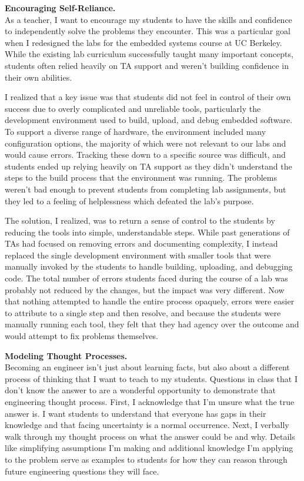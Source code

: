\documentclass[12pt]{article} %
\begin{document}
\textbf{\textsf{\large Encouraging Self-Reliance.}}\\
As a teacher, I want to encourage my students to have the skills and confidence
to independently solve the problems they encounter. This was a particular goal
when I redesigned the labs for the embedded systems course at UC Berkeley.
While the existing lab curriculum successfully taught many important concepts,
students often relied heavily on TA support and weren't building confidence in
their own abilities.

I realized that a key issue was that students did not feel in control of their
own success due to overly complicated and unreliable tools, particularly the
development environment used to build, upload, and debug embedded software. To
support a diverse range of hardware, the environment included many
configuration options, the majority of which were not relevant to our labs and
would cause errors. Tracking these down to a specific source was difficult, and
students ended up relying heavily on TA support as they didn't understand the
steps to the build process that the environment was running. The problems
weren't bad enough to prevent students from completing lab assignments, but
they led to a feeling of helplessness which defeated the lab's purpose.

The solution, I realized, was to return a sense of control to the students by
reducing the tools into simple, understandable steps. While past generations of
TAs had focused on removing errors and documenting complexity, I instead
replaced the single development environment with smaller tools that were
manually invoked by the students to handle building, uploading, and debugging
code. The total number of errors students faced during the course of a lab was
probably not reduced by the changes, but the impact was very different. Now
that nothing attempted to handle the entire process opaquely, errors were
easier to attribute to a single step and then resolve, and because the students
were manually running each tool, they felt that they had agency over the
outcome and would attempt to fix problems themselves.

\textbf{\textsf{\large Modeling Thought Processes.}}\\
Becoming an engineer isn't just about learning facts, but also about a
different process of thinking that I want to teach to my students. Questions in
class that I don't know the answer to are a wonderful opportunity to
demonstrate that engineering thought process. First, I acknowledge that I'm
unsure what the true answer is. I want students to understand that everyone has
gaps in their knowledge and that facing uncertainty is a normal occurrence.
Next, I verbally walk through my thought process on what the answer could be
and why. Details like simplifying assumptions I'm making and additional
knowledge I'm applying to the problem serve as examples to students for how
they can reason through future engineering questions they will face.
\end{document}
